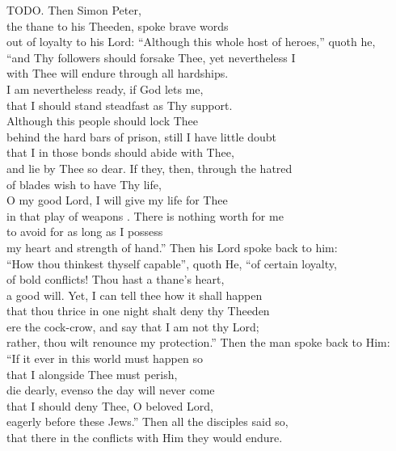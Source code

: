 \bvb TODO.  Then Simon Peter, \\
the thane to his Theeden, spoke brave words \\
out of loyalty to his Lord: “Although this whole host of heroes,” quoth he, \\
“and Thy followers should forsake Thee, yet nevertheless I \\
with Thee will endure through all hardships.  \\
I am nevertheless ready, if God lets me, \\
that I should stand steadfast as Thy support. \\
Although this people should lock Thee \\
behind the hard bars of prison, still I have little doubt \\
that I in those bonds should abide with Thee, \\
and lie by Thee so dear.  If they, then, through the hatred \\
of blades  wish to have Thy life, \\
O my good Lord, I will give my life for Thee \\
in that play of weapons .  There is nothing worth for me \\
to avoid for as long as I possess \\
my heart and strength of hand.”  Then his Lord spoke back to him: \\
“How thou thinkest thyself capable”, quoth He, “of certain loyalty, \\
of bold conflicts!  Thou hast a thane’s heart, \\
a good will.  Yet, I can tell thee how it shall happen \\
that thou thrice in one night shalt deny thy Theeden \\
ere the cock-crow, and say that I am not thy Lord; \\
rather, thou wilt renounce my protection.”  Then the man spoke back to Him: \\
“If it ever in this world must happen so \\
that I alongside Thee must perish, \\
die dearly, evenso the day will never come \\
that I should deny Thee, O beloved Lord, \\
eagerly before these Jews.”  Then all the disciples said so, \\
that there in the conflicts with Him they would endure.\evb\evg


